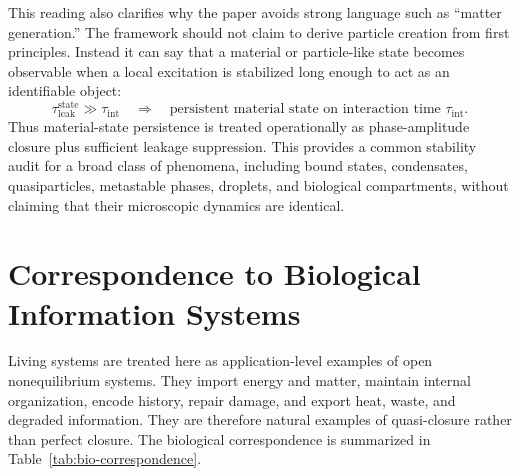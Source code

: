 \documentclass[11pt,a4paper]{article}
\newcommand{\taul}{\tau_{\mathrm{leak}}}
\begin{document}
This reading also clarifies why the paper avoids strong language such as ``matter generation.''  The framework should not claim to derive particle creation from first principles.  Instead it can say that a material or particle-like state becomes observable when a local excitation is stabilized long enough to act as an identifiable object:
\begin{equation}
  \taul^{\mathrm{state}}\gg \tau_{\mathrm{int}}
  \quad\Rightarrow\quad
  \text{persistent material state on interaction time }\tau_{\mathrm{int}}.
  \label{eq:material-stability}
\end{equation}
Thus material-state persistence is treated operationally as phase-amplitude closure plus sufficient leakage suppression.  This provides a common stability audit for a broad class of phenomena, including bound states, condensates, quasiparticles, metastable phases, droplets, and biological compartments, without claiming that their microscopic dynamics are identical.

\section{Correspondence to Biological Information Systems}
Living systems are treated here as application-level examples of open nonequilibrium systems.  They import energy and matter, maintain internal organization, encode history, repair damage, and export heat, waste, and degraded information.  They are therefore natural examples of quasi-closure rather than perfect closure.  The biological correspondence is summarized in Table~\ref{tab:bio-correspondence}.
\end{document}
